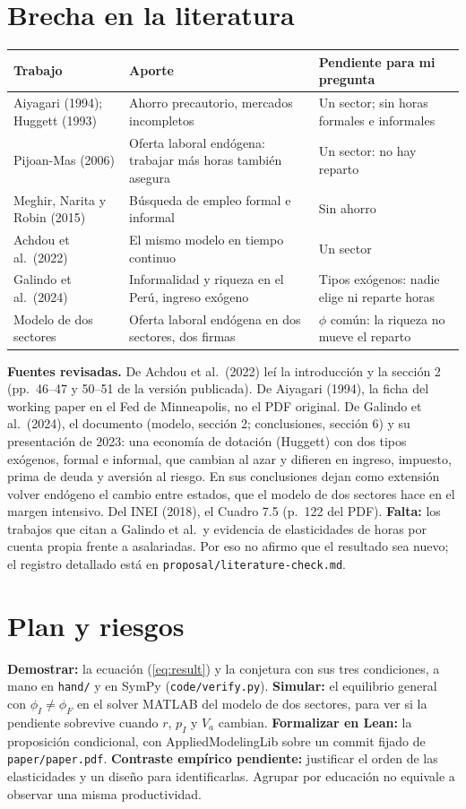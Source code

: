 \documentclass[11pt]{article}
\begin{document}
\section{Brecha en la literatura}
\begin{center}
\small
\renewcommand{\arraystretch}{1.12}
\begin{tabular}{@{}p{38mm}p{52mm}p{60mm}@{}}
\toprule
Trabajo & Aporte & Pendiente para mi pregunta\\
\midrule
Aiyagari (1994); Huggett (1993) & Ahorro precautorio, mercados incompletos & Un sector; sin horas formales e informales\\
Pijoan-Mas (2006) & Oferta laboral endógena: trabajar más horas también asegura & Un sector: no hay reparto\\
Meghir, Narita y Robin (2015) & Búsqueda de empleo formal e informal & Sin ahorro\\
Achdou et al.\ (2022) & El mismo modelo en tiempo continuo & Un sector\\
Galindo et al.\ (2024) & Informalidad y riqueza en el Perú, ingreso exógeno & Tipos exógenos: nadie elige ni reparte horas\\
Modelo de dos sectores & Oferta laboral endógena en dos sectores, dos firmas & $\phi$ común: la riqueza no mueve el reparto\\
\bottomrule
\end{tabular}
\end{center}
\textbf{Fuentes revisadas.} De Achdou et al.\ (2022) leí la introducción y la sección 2 (pp.~46--47 y 50--51 de la versión publicada).
De Aiyagari (1994), la ficha del working paper en el Fed de Minneapolis, no el PDF original. De Galindo et al.\ (2024), el documento (modelo, sección 2; conclusiones, sección 6) y su presentación de 2023: una economía de dotación (Huggett) con dos tipos exógenos, formal e informal, que cambian al azar y difieren en ingreso, impuesto, prima de deuda y aversión al riesgo. En sus conclusiones dejan como extensión volver endógeno el cambio entre estados, que el modelo de dos sectores hace en el margen intensivo. Del INEI (2018), el Cuadro 7.5 (p.~122 del PDF).
\textbf{Falta:} los trabajos que citan a Galindo et al.\ y evidencia de elasticidades de horas por cuenta propia frente a
asalariadas. Por eso no afirmo que el resultado sea nuevo; el registro detallado está
en \texttt{proposal/literature-check.md}.

\section{Plan y riesgos}
\textbf{Demostrar:} la ecuación (\ref{eq:result}) y la conjetura con sus tres condiciones, a mano en \texttt{hand/} y en SymPy (\texttt{code/verify.py}).
\textbf{Simular:} el equilibrio general con $\phi_I\neq\phi_F$ en el solver MATLAB del modelo de dos sectores, para ver si la pendiente sobrevive cuando $r$, $p_I$ y $V_a$
cambian. \textbf{Formalizar en Lean:} la proposición condicional, con AppliedModelingLib sobre un commit fijado de \texttt{paper/paper.pdf}.
\textbf{Contraste empírico pendiente:} justificar el orden de las elasticidades y un diseño para identificarlas. Agrupar por educación no equivale a observar una misma productividad.
\end{document}
